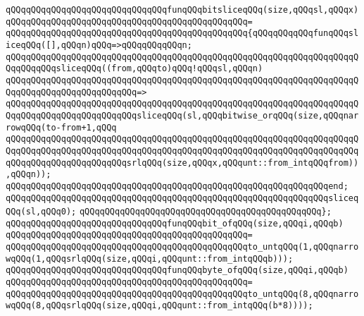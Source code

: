 \verb|qQQqqQQqqQQqqQQqqQQqqQQqqQQqqQQqfunqQQqbitsliceqQQq(size,qQQqsl,qQQqx)|\newline
\verb|qQQqqQQqqQQqqQQqqQQqqQQqqQQqqQQqqQQqqQQqqQQqqQQq=|\newline
\verb|qQQqqQQqqQQqqQQqqQQqqQQqqQQqqQQqqQQqqQQqqQQqqQQq{qQQqqQQqqQQqfunqQQqsliceqQQq([],qQQqn)qQQq=>qQQqqQQqqQQqn;|\newline
\newline
\verb|qQQqqQQqqQQqqQQqqQQqqQQqqQQqqQQqqQQqqQQqqQQqqQQqqQQqqQQqqQQqqQQqqQQqqQQqqQQqqQQqsliceqQQq((from,qQQqto)qQQq!qQQqsl,qQQqn)|\newline
\verb|qQQqqQQqqQQqqQQqqQQqqQQqqQQqqQQqqQQqqQQqqQQqqQQqqQQqqQQqqQQqqQQqqQQqqQQqqQQqqQQqqQQqqQQqqQQqqQQq=>|\newline
\verb|qQQqqQQqqQQqqQQqqQQqqQQqqQQqqQQqqQQqqQQqqQQqqQQqqQQqqQQqqQQqqQQqqQQqqQQqqQQqqQQqqQQqqQQqqQQqqQQqsliceqQQq(sl,qQQqbitwise_orqQQq(size,qQQqnarrowqQQq(to-from+1,qQQq|\newline
\verb|qQQqqQQqqQQqqQQqqQQqqQQqqQQqqQQqqQQqqQQqqQQqqQQqqQQqqQQqqQQqqQQqqQQqqQQqqQQqqQQqqQQqqQQqqQQqqQQqqQQqqQQqqQQqqQQqqQQqqQQqqQQqqQQqqQQqqQQqqQQqqQQqqQQqqQQqqQQqqQQqqQQqsrlqQQq(size,qQQqx,qQQqunt::from_intqQQqfrom)),qQQqn));|\newline
\verb|qQQqqQQqqQQqqQQqqQQqqQQqqQQqqQQqqQQqqQQqqQQqqQQqqQQqqQQqqQQqqQQqend;|\newline
\newline
\verb|qQQqqQQqqQQqqQQqqQQqqQQqqQQqqQQqqQQqqQQqqQQqqQQqqQQqqQQqqQQqqQQqsliceqQQq(sl,qQQq0);|\newline
\verb|qQQqqQQqqQQqqQQqqQQqqQQqqQQqqQQqqQQqqQQqqQQqqQQq};|\newline
\newline
\verb|qQQqqQQqqQQqqQQqqQQqqQQqqQQqqQQqfunqQQqbit_ofqQQq(size,qQQqi,qQQqb)|\newline
\verb|qQQqqQQqqQQqqQQqqQQqqQQqqQQqqQQqqQQqqQQqqQQqqQQq=|\newline
\verb|qQQqqQQqqQQqqQQqqQQqqQQqqQQqqQQqqQQqqQQqqQQqqQQqto_untqQQq(1,qQQqnarrowqQQq(1,qQQqsrlqQQq(size,qQQqi,qQQqunt::from_intqQQqb)));|\newline
\newline
\verb|qQQqqQQqqQQqqQQqqQQqqQQqqQQqqQQqfunqQQqbyte_ofqQQq(size,qQQqi,qQQqb)|\newline
\verb|qQQqqQQqqQQqqQQqqQQqqQQqqQQqqQQqqQQqqQQqqQQqqQQq=|\newline
\verb|qQQqqQQqqQQqqQQqqQQqqQQqqQQqqQQqqQQqqQQqqQQqqQQqto_untqQQq(8,qQQqnarrowqQQq(8,qQQqsrlqQQq(size,qQQqi,qQQqunt::from_intqQQq(b*8))));|\newline
